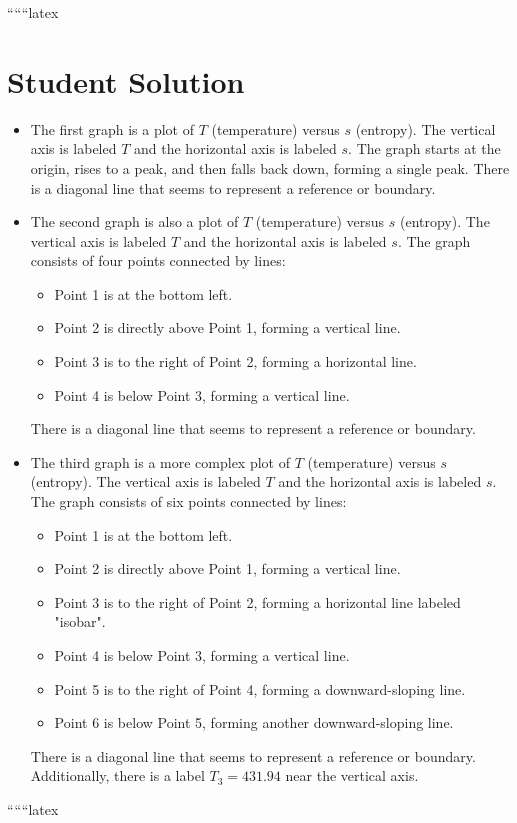 
``````latex


\section*{Student Solution}

\begin{itemize}
    \item The first graph is a plot of \( T \) (temperature) versus \( s \) (entropy). The vertical axis is labeled \( T \) and the horizontal axis is labeled \( s \). The graph starts at the origin, rises to a peak, and then falls back down, forming a single peak. There is a diagonal line that seems to represent a reference or boundary.
    
    \item The second graph is also a plot of \( T \) (temperature) versus \( s \) (entropy). The vertical axis is labeled \( T \) and the horizontal axis is labeled \( s \). The graph consists of four points connected by lines: 
        \begin{itemize}
            \item Point 1 is at the bottom left.
            \item Point 2 is directly above Point 1, forming a vertical line.
            \item Point 3 is to the right of Point 2, forming a horizontal line.
            \item Point 4 is below Point 3, forming a vertical line.
        \end{itemize}
        There is a diagonal line that seems to represent a reference or boundary.
    
    \item The third graph is a more complex plot of \( T \) (temperature) versus \( s \) (entropy). The vertical axis is labeled \( T \) and the horizontal axis is labeled \( s \). The graph consists of six points connected by lines:
        \begin{itemize}
            \item Point 1 is at the bottom left.
            \item Point 2 is directly above Point 1, forming a vertical line.
            \item Point 3 is to the right of Point 2, forming a horizontal line labeled "isobar".
            \item Point 4 is below Point 3, forming a vertical line.
            \item Point 5 is to the right of Point 4, forming a downward-sloping line.
            \item Point 6 is below Point 5, forming another downward-sloping line.
        \end{itemize}
        There is a diagonal line that seems to represent a reference or boundary. Additionally, there is a label \( T_3 = 431.94 \) near the vertical axis.
\end{itemize}

``````latex


